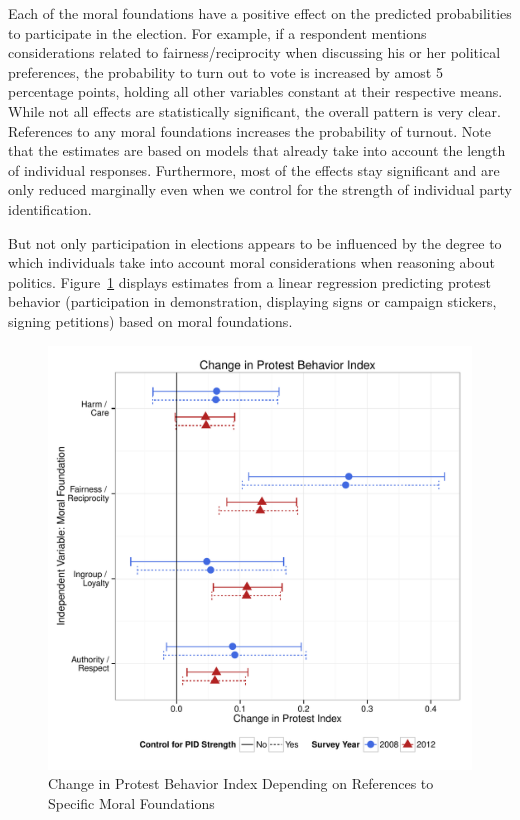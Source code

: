 \documentclass[12pt]{article}
\begin{document}
Each of the moral foundations have a positive effect on the predicted probabilities to participate in the election. For example, if a respondent mentions considerations related to fairness/reciprocity when discussing his or her political preferences, the probability to turn out to vote is increased by amost 5 percentage points, holding all other variables constant at their respective means. While not all effects are statistically significant, the overall pattern is very clear. References to any moral foundations increases the probability of turnout. Note that the estimates are based on models that already take into account the length of individual responses. Furthermore, most of the effects stay significant and are only reduced marginally even when we control for the strength of individual party identification.

But not only participation in elections appears to be influenced by the degree to which individuals take into account moral considerations when reasoning about politics. Figure~\ref{fig:m2b_vote} displays estimates from a linear regression predicting protest behavior (participation in demonstration, displaying signs or campaign stickers, signing petitions) based on moral foundations.

\begin{figure}[ht]\centering
\includegraphics[scale=.5]{../calc/fig/m2e_part.pdf}
\caption{Change in Protest Behavior Index Depending on References to Specific Moral Foundations}\label{fig:m2b_vote}
\end{figure}
\end{document}
